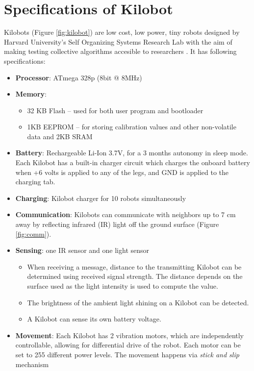 \documentclass{report}[12pt]
\begin{document}
\section{Specifications of Kilobot}
Kilobots (Figure \ref{fig:kilobot}) are low cost, low power, tiny robots designed by Harvard University's Self Organizing Systems Research Lab with the aim of making testing collective algorithms accesible to researchers \cite{kilobotics_manual}. It has following specifications:
\begin{itemize}
\item \textbf{Processor}: ATmega 328p (8bit @ 8MHz)
\item \textbf{Memory}: 
\begin{itemize}
\item 32 KB Flash -- used for both user program and bootloader 
\item 1KB EEPROM -- for storing calibration values and other non-volatile data and 2KB SRAM
\end{itemize}
\item \textbf{Battery}: Rechargeable Li-Ion 3.7V, for a 3 months autonomy in
sleep mode. Each Kilobot has a built-in charger circuit which charges the onboard battery when +6 volts is applied to any of the legs, and GND is applied to the charging tab. 
\item \textbf{Charging}: Kilobot charger for 10 robots simultaneously
\item \textbf{Communication}: Kilobots can communicate with neighbors up to 7 cm away by reflecting infrared (IR) light off the ground surface (Figure \ref{fig:comm}). 
\item \textbf{Sensing}: one IR sensor and one light sensor 
\begin{itemize}
\item When receiving a message, distance to the transmitting Kilobot can be determined using received signal strength. The distance depends on the surface used as the light intensity is used to compute the value.
\item The brightness of the ambient light shining on a Kilobot can be detected.
\item A Kilobot can sense its own battery voltage.
\end{itemize}
\item \textbf{Movement}: Each Kilobot has 2 vibration motors, which are
independently controllable, allowing for differential drive
of the robot. Each motor can be set to 255 different power
levels. The movement happens via \emph{stick and slip} mechanism

\end{itemize}
\end{document}
